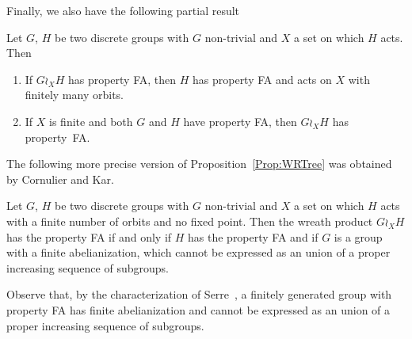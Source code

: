 Finally, we also have the following partial result
\begin{prop}\label{Prop:WRTree}
Let $G$, $H$ be two discrete groups with $G$ non-trivial and $X$ a set on which $H$ acts.
Then
\begin{enumerate}
\item
If $G\wr_X H$ has property FA, then $H$ has property FA and acts on $X$ with finitely many orbits.
\item
If $X$ is finite and both $G$ and $H$ have property FA, then $G\wr_X H$ has property~FA.
\end{enumerate}
\end{prop}


The following more precise version of Proposition~\ref{Prop:WRTree}  was obtained by Cornulier and Kar.
\begin{thm}\label{Thm:CornulierKar}
Let $G$, $H$ be two discrete groups with $G$ non-trivial and $X$ a set on which $H$ acts with a finite number of orbits and no fixed point. Then the wreath product $G \wr_X H$ has the property FA if and only if $H$ has the property FA and if $G$ is a group with a finite abelianization, which cannot be expressed as an union of a proper increasing sequence of subgroups.
\end{thm}
Observe that, by the characterization of Serre~\cite{MR0476875}, a finitely generated group with property FA has finite abelianization and cannot be expressed as an union of a proper increasing sequence of subgroups.

